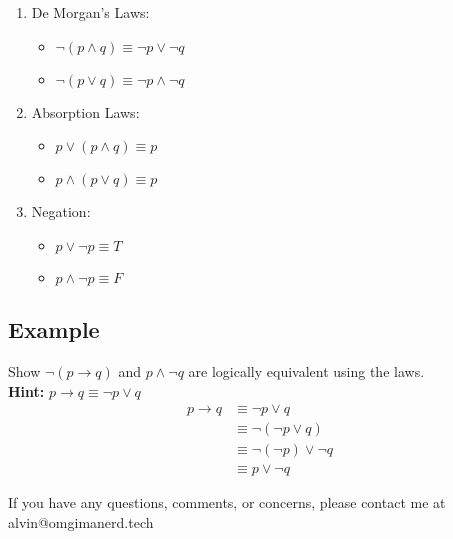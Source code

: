 \documentclass[letterpaper, 12pt]{math}
\begin{document}
\begin{enumerate}
  \item De Morgan's Laws:
  \begin{itemize}
    \item \( \neg{(p \wedge q)} \equiv \neg{p} \vee \neg{q} \)
    \item \( \neg{(p \vee q)} \equiv \neg{p} \wedge \neg{q} \)
  \end{itemize}
  \item Absorption Laws:
  \begin{itemize}
    \item \( p \vee (p \wedge q) \equiv p \)
    \item \( p \wedge (p \vee q) \equiv p \)
  \end{itemize}
  \item Negation:
  \begin{itemize}
    \item \( p \vee \neg{p} \equiv T \)
    \item \( p \wedge \neg{p} \equiv F \)
  \end{itemize}
\end{enumerate}

\subsection*{Example}
Show \( \neg{(p \to q)} \) and \( p \wedge \neg{q} \) are logically equivalent
using the laws. \\
\textbf{Hint:} \( p \to q \equiv \neg{p} \vee q \)
\begin{align*}
  p \to q &\equiv \neg{p} \vee q \\
  &\equiv \neg{(\neg{p} \vee q)} \\
  &\equiv \neg{(\neg{p})} \vee \neg{q} \\
  &\equiv p \vee \neg{q}
\end{align*}

\begin{center}
  If you have any questions, comments, or concerns, please contact me at
  alvin@omgimanerd.tech
\end{center}
\end{document}
